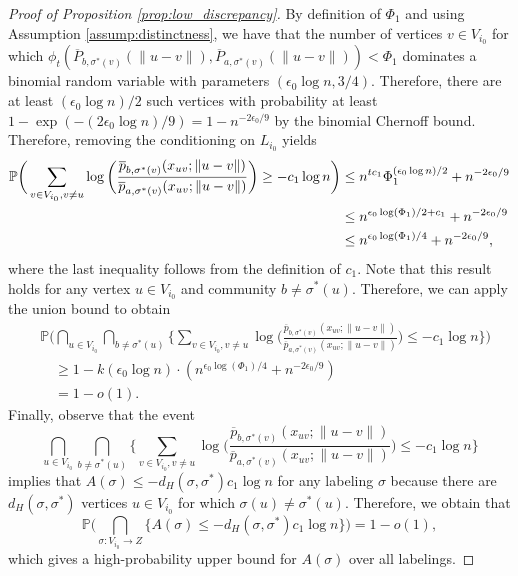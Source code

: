 \documentclass{article}
\renewcommand{\P}{\mathbb{P}}
\newcommand{\1}{\mathbbm{1}}
\theoremstyle{definition}
\theoremstyle{plain}
\begin{document}
\begin{proof}[Proof of Proposition \ref{prop:low_discrepancy}]
    By definition of $\Phi_1$ and using Assumption \ref{assump:distinctness}, we have that the number of vertices $v \in V_{i_0}$ for which $\phi_t(\overline{P}_{b,\sigma^*(v)}(\|u - v\|), \overline{P}_{a,\sigma^*(v)}(\|u - v\|)) < \Phi_1$ dominates a binomial random variable with parameters $(\epsilon_0 \log n, 3/4)$. Therefore, there are at least $(\epsilon_0 \log n)/2$ such vertices with probability at least $1 - \exp\left(-(2 \epsilon_0 \log n)/{9} \right) = 1 - n^{-2\epsilon_0/9}$ by the binomial Chernoff bound. Therefore, removing the conditioning on $L_{i_0}$ yields
    \begin{align*}
    \P\bigg(\sum_{v \in V_{i_0}, v \neq u} \log \bigg(\frac{\overline{p}_{b,\sigma^*(v)}(x_{uv}; \|u - v\|)}{\overline{p}_{a,\sigma^*(v)}(x_{uv}; \|u - v\|)} \bigg) \geq -c_1 \log n \bigg) 
        &\leq n^{tc_1} \Phi_1^{(\epsilon_0 \log n) / 2} + n^{-2\epsilon_0/9} \notag \\
        &\leq n^{\epsilon_0 \log(\Phi_1)/2 + c_1} + n^{-2\epsilon_0/9} \notag \\
        &\leq n^{\epsilon_0 \log(\Phi_1)/4} + n^{-2\epsilon_0/9},
    \end{align*} 
    where the last inequality follows from the definition of $c_1$. Note that this result holds for any vertex $u \in V_{i_0}$ and community $b \neq \sigma^*(u)$. Therefore, we can apply the union bound to obtain
    \begin{align*}
        &\P\Bigg( \bigcap_{u \in V_{i_0}} \bigcap_{b \neq \sigma^*(u)} \bigg\{ \sum_{v \in V_{i_0}, v \neq u} \log \bigg(\frac{\overline{p}_{b,\sigma^*(v)}(x_{uv}; \|u - v\|)}{\overline{p}_{a,\sigma^*(v)}(x_{uv}; \|u - v\|)} \bigg) \leq -c_1 \log n \bigg\} \Bigg) \\
        &\quad \geq 1 - k (\epsilon_0 \log n) \cdot \left(n^{\epsilon_0 \log(\Phi_1) / 4}  + n^{-2\epsilon_0/9}\right) \\
        &\quad= 1 - o(1).
    \end{align*}
    Finally, observe that the event  
    \begin{equation*}
        \bigcap_{u \in V_{i_0}} \bigcap_{b \neq \sigma^*(u)} \bigg\{ \sum_{v \in V_{i_0}, v \neq u} \log \bigg(\frac{\overline{p}_{b,\sigma^*(v)}(x_{uv}; \|u - v\|)}{\overline{p}_{a,\sigma^*(v)}(x_{uv}; \|u - v\|)} \bigg) \leq -c_1 \log n \bigg\}
    \end{equation*}
    implies that $A(\sigma) \leq -d_H(\sigma, \sigma^*) c_1 \log n$ for any labeling $\sigma$ because there are $d_H(\sigma, \sigma^*)$ vertices $u \in V_{i_0}$ for which $\sigma(u) \neq \sigma^*(u)$. Therefore, we obtain that
    \begin{equation*}
        \P\bigg(\bigcap_{\sigma:V_{i_0} \to Z} \{A(\sigma) \leq -d_H(\sigma, \sigma^*) c_1 \log n \} \bigg) = 1 - o(1),
    \end{equation*}
    which gives a high-probability upper bound for $A(\sigma)$ over all labelings.


\end{proof}
\end{document}
